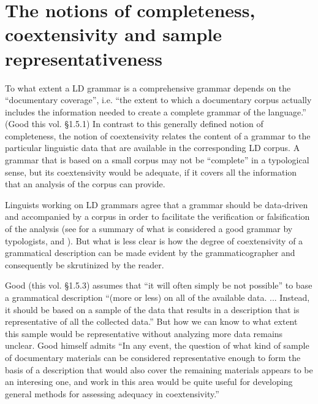\section{The notions of completeness, coextensivity and sample representativeness}%


To what extent a LD grammar is a comprehensive grammar depends on the ``documentary coverage'', i.e. ``the extent to which a documentary corpus actually includes the information needed to create a complete grammar of the language.'' (Good this vol. {\S}1.5.1) In contrast to this generally defined notion of completeness, the notion of coextensivity relates the content of a grammar to the particular linguistic data that are available in the corresponding LD corpus. A grammar that is based on a small corpus may not be ``complete'' in a typological sense, but its coextensivity would be adequate, if it covers all the information that an analysis of the corpus can provide. 

Linguists working on LD grammars agree that a grammar should be data-driven and accompanied by a corpus in order to facilitate the verification or falsification of the analysis (see \citet{Nordhoff2008} for a summary of what is considered a good grammar by typologists, and \citet{Bendertv}). But what is less clear is how the degree of coextensivity of a grammatical description can be made evident by the grammaticographer and consequently be skrutinized by the reader. 

Good (this vol. {\S}1.5.3) assumes that ``it will often simply be not possible'' to base a grammatical description ``(more or less) on all of the available data. ... Instead, it should be based on a sample of the data that results in a description that is representative of all the collected data.'' But how we can know to what extent this sample would be representative without analyzing more data remains unclear. Good himself admits ``In any event, the question of what kind of sample of documentary materials can be considered representative enough to form the basis of a description that would also cover the remaining materials appears to be an interesing one, and work in this area would be quite useful for developing general methods for assessing adequacy in coextensivity.'' 



